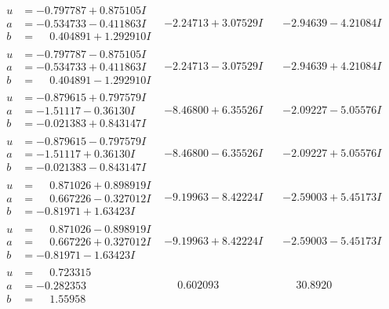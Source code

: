 \documentclass[1p]{elsarticle_modified}
\theoremstyle{definition}
\begin{document}
$$\begin{array}{c|c|c}
\begin{aligned}
u &= -0.797787 + 0.875105 I \\
a &= -0.534733 - 0.411863 I \\
b &= \phantom{-}0.404891 + 1.292910 I\end{aligned}
 & -2.24713 + 3.07529 I & -2.94639 - 4.21084 I \\ \hline\begin{aligned}
u &= -0.797787 - 0.875105 I \\
a &= -0.534733 + 0.411863 I \\
b &= \phantom{-}0.404891 - 1.292910 I\end{aligned}
 & -2.24713 - 3.07529 I & -2.94639 + 4.21084 I \\ \hline\begin{aligned}
u &= -0.879615 + 0.797579 I \\
a &= -1.51117 - 0.36130 I \\
b &= -0.021383 + 0.843147 I\end{aligned}
 & -8.46800 + 6.35526 I & -2.09227 - 5.05576 I \\ \hline\begin{aligned}
u &= -0.879615 - 0.797579 I \\
a &= -1.51117 + 0.36130 I \\
b &= -0.021383 - 0.843147 I\end{aligned}
 & -8.46800 - 6.35526 I & -2.09227 + 5.05576 I \\ \hline\begin{aligned}
u &= \phantom{-}0.871026 + 0.898919 I \\
a &= \phantom{-}0.667226 - 0.327012 I \\
b &= -0.81971 + 1.63423 I\end{aligned}
 & -9.19963 - 8.42224 I & -2.59003 + 5.45173 I \\ \hline\begin{aligned}
u &= \phantom{-}0.871026 - 0.898919 I \\
a &= \phantom{-}0.667226 + 0.327012 I \\
b &= -0.81971 - 1.63423 I\end{aligned}
 & -9.19963 + 8.42224 I & -2.59003 - 5.45173 I \\ \hline\begin{aligned}
u &= \phantom{-}0.723315\phantom{ +0.000000I} \\
a &= -0.282353\phantom{ +0.000000I} \\
b &= \phantom{-}1.55958\phantom{ +0.000000I}\end{aligned}
 & \phantom{-}0.602093\phantom{ +0.000000I} & \phantom{-}30.8920\phantom{ +0.000000I} \\ \hline\begin{aligned}

\end{aligned}
\end{array}$$
\end{document}
